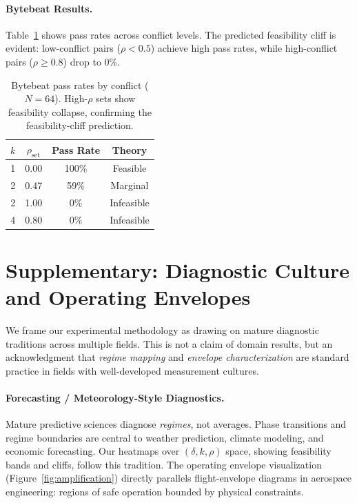 \documentclass{article}
\theoremstyle{plain}
\theoremstyle{definition}
\theoremstyle{remark}
\begin{document}
\paragraph{Bytebeat Results.}
Table~\ref{tab:bytebeat} shows pass rates across conflict levels. The predicted feasibility cliff is evident: low-conflict pairs ($\rho < 0.5$) achieve high pass rates, while high-conflict pairs ($\rho \geq 0.8$) drop to 0\%.

\begin{table}[ht]
\centering
\small
\caption{Bytebeat pass rates by conflict ($N=64$). High-$\rho$ sets show feasibility collapse, confirming the feasibility-cliff prediction.}
\label{tab:bytebeat}
\begin{tabular}{cccc}
\toprule
$k$ & $\rho_{\text{set}}$ & Pass Rate & Theory \\
\midrule
1 & 0.00 & 100\% & Feasible \\
2 & 0.47 & 59\% & Marginal \\
2 & 1.00 & 0\% & Infeasible \\
4 & 0.80 & 0\% & Infeasible \\
\bottomrule
\end{tabular}
\end{table}

\section{Supplementary: Diagnostic Culture and Operating Envelopes}\label{app:diagnostic_culture}

We frame our experimental methodology as drawing on mature diagnostic traditions across multiple fields. This is not a claim of domain results, but an acknowledgment that \emph{regime mapping} and \emph{envelope characterization} are standard practice in fields with well-developed measurement cultures.

\paragraph{Forecasting / Meteorology-Style Diagnostics.}
Mature predictive sciences diagnose \emph{regimes}, not averages. Phase transitions and regime boundaries are central to weather prediction, climate modeling, and economic forecasting. Our heatmaps over $(\delta, k, \rho)$ space, showing feasibility bands and cliffs, follow this tradition. The operating envelope visualization (Figure~\ref{fig:amplification}) directly parallels flight-envelope diagrams in aerospace engineering: regions of safe operation bounded by physical constraints.
\end{document}
